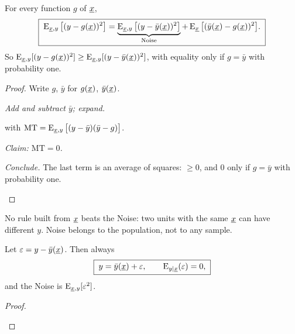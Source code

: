 \begin{theorem}
For every function $g$ of $\underline{x}$,
\[
  \boxed{\;\operatorname{E}_{\underline{x},y}\big[(y-g(\underline{x}))^2\big]
  =\underbrace{\operatorname{E}_{\underline{x},y}\big[(y-\bar y(\underline{x}))^2\big]}_{\text{Noise}}
  +\operatorname{E}_{\underline{x}}\big[(\bar y(\underline{x})-g(\underline{x}))^2\big].\;}
\]
So $\operatorname{E}_{\underline{x},y}[(y-g(\underline{x}))^2]\ge\operatorname{E}_{\underline{x},y}[(y-\bar y(\underline{x}))^2]$, with equality only if $g=\bar y$ with probability one.
\end{theorem}
\begin{proof}
Write $g$, $\bar y$ for $g(\underline{x})$, $\bar y(\underline{x})$.
\begin{steps}
  \item \emph{Add and subtract $\bar y$; expand.}
  \begin{deriv}
  \end{deriv}
  with $\text{MT}=\operatorname{E}_{\underline{x},y}\big[(y-\bar y)(\bar y-g)\big]$.
  \item \emph{Claim: $\text{MT}=0$.}
  \begin{deriv}
  \end{deriv}
  \item \emph{Conclude.} The last term is an average of squares: $\ge0$, and $0$ only if $g=\bar y$ with probability one.\qedhere
\end{steps}
\end{proof}

No rule built from $\underline{x}$ beats the Noise: two units with the same $\underline{x}$ can have different $y$. Noise belongs to the population, not to any sample.

\begin{corollary}
Let $\varepsilon=y-\bar y(\underline{x})$. Then always
\[
  \boxed{\;y=\bar y(\underline{x})+\varepsilon,\qquad\operatorname{E}_{y\mid\underline{x}}(\varepsilon)=0,\;}
\]
and the Noise is $\operatorname{E}_{\underline{x},y}[\varepsilon^2]$.
\end{corollary}
\begin{proof}
\begin{deriv}
\end{deriv}
\end{proof}

